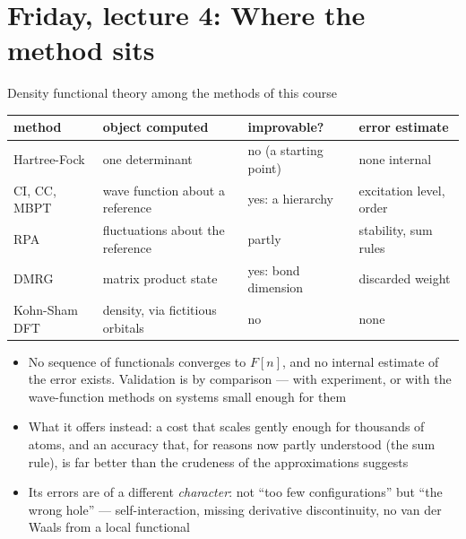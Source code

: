 \documentclass[aspectratio=169,10pt]{beamer}
\begin{document}
\section{Friday, lecture 4: Where the method sits}

\begin{frame}{Density functional theory among the methods of this course}
  \begin{center}\small
  \begin{tabular}{@{}llll@{}}\toprule
  method & object computed & improvable? & error estimate\\\midrule
  Hartree-Fock & one determinant & no (a starting point) & none internal\\
  CI, CC, MBPT & wave function about a reference & yes: a hierarchy & excitation level, order\\
  RPA & fluctuations about the reference & partly & stability, sum rules\\
  DMRG & matrix product state & yes: bond dimension & discarded weight\\
  Kohn-Sham DFT & density, via fictitious orbitals & \alert{no} & \alert{none}\\\bottomrule
  \end{tabular}
  \end{center}
  \begin{itemize}
    \item No sequence of functionals converges to $F[n]$, and no internal estimate of the error exists. Validation is by comparison --- with experiment, or with the wave-function methods on systems small enough for them
    \item What it offers instead: a cost that scales gently enough for thousands of atoms, and an accuracy that, for reasons now partly understood (the sum rule), is far better than the crudeness of the approximations suggests
    \item Its errors are of a different \emph{character}: not ``too few configurations'' but ``the wrong hole'' --- self-interaction, missing derivative discontinuity, no van der Waals from a local functional
  \end{itemize}
\end{frame}
\end{document}
